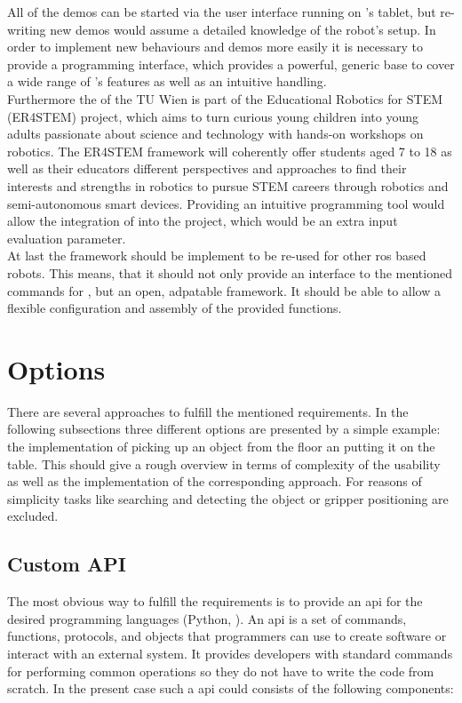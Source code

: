 All of the demos can be started via the user interface running on \hobbit{}'s tablet, but re-writing new demos would assume a detailed knowledge of the robot's setup. In order to implement new behaviours and demos more easily it is necessary to provide a programming interface, which provides a powerful, generic base to cover a wide range of \hobbit's features as well as an intuitive handling.\\

Furthermore the \ACIN{} of the TU Wien is part of the Educational Robotics for STEM (ER4STEM) project, which aims to turn curious young children into young adults passionate about science and technology with hands-on workshops on robotics. The ER4STEM framework will coherently offer students aged 7 to 18 as well as their educators different perspectives and approaches to find their interests and strengths in robotics to pursue STEM careers through robotics and semi-autonomous smart devices. \cite{ER4STEMACIN} Providing an intuitive programming tool would allow the integration of \hobbit{} into the project, which would be an extra input evaluation parameter.\\

At last the framework should be implement to be re-used for other \gls{ros} based robots. This means, that it should not only provide an interface to the mentioned commands for \hobbit{}, but an open, adpatable framework. It should be able to allow a flexible configuration and assembly of the provided functions.

\section{Options} \label{sec:Options}
There are several approaches to fulfill the mentioned requirements. In the following subsections three different options are presented by a simple example: the implementation of picking up an object from the floor an putting it on the table. This should give a rough overview in terms of complexity of the usability as well as the implementation of the corresponding approach. For reasons of simplicity tasks like searching and detecting the object or gripper positioning are excluded.

\subsection{Custom API}
\label{sub:PyApi}
The most obvious way to fulfill the requirements is to provide an \gls{api} for the desired programming languages (Python, \Cpp{}). An \gls{api} is a set of commands, functions, protocols, and objects that programmers can use to create software or interact with an external system. It provides developers with standard commands for performing common operations so they do not have to write the code from scratch. In the present case such a \gls{api} could consists of the following components:

